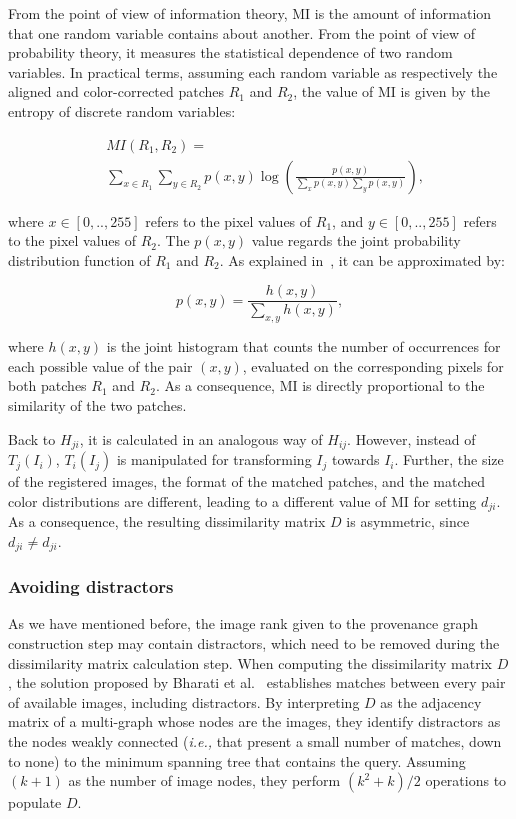 From the point of view of information theory, MI is the amount of information that one random variable contains about another.
From the point of view of probability theory, it measures the statistical dependence of two random variables.
In practical terms, assuming each random variable as respectively the aligned and color-corrected patches $R_1$ and $R_2$, the value of MI is given by the entropy of discrete random variables:
\vspace{-0.2cm}

\begin{equation}
\begin{aligned}
& MI(R_1, R_2) = \\
& \sum_{x \in R_1}^{ }{\sum_{y \in R_2}^{ }{p(x, y)}} \log \left ( \frac{p(x, y)}{\sum_{x}^{ } {p(x, y)} \sum_{y}^{ } {p(x, y)}} \right ),
\end{aligned}
\end{equation}

\noindent where $x \in [0,..,255]$ refers to the pixel values of $R_1$, and $y \in [0,..,255]$ refers to the pixel values of $R_2$.
The $p(x, y)$ value regards the joint probability distribution function of $R_1$ and $R_2$.
As explained in~\cite{Costa_2017}, it can be approximated by:

\begin{equation}
p(x, y) = \frac{h(x, y)}{\sum_{x, y}^{ } {h(x, y)}},
\end{equation}

\noindent where $h(x, y)$ is the joint histogram that counts the number of occurrences for each possible value of the pair $(x, y)$, evaluated on the corresponding pixels for both patches $R_1$ and $R_2$.
As a consequence, MI is directly proportional to the similarity of the two patches.

Back to $H_{ji}$, it is calculated in an analogous way of $H_{ij}$.
However, instead of $T_j(I_i)$, $T_i(I_j)$ is manipulated for transforming $I_j$ towards $I_i$. Further, the size of the registered images, the format of the matched patches, and the matched color distributions are different, leading to a different value of MI for setting $d_{ji}$.
As a consequence, the resulting dissimilarity matrix $D$ is asymmetric, since $d_{ji}\ne d_{ji}$.

\vspace{0.2cm}
\subsubsection*{Avoiding distractors}
As we have mentioned before, the image rank given to the provenance graph construction step may contain distractors, which need to be removed during the dissimilarity matrix calculation step.
When computing the dissimilarity matrix $D$, the solution proposed by Bharati et al.~\cite{bharati2017uphy} establishes matches between every pair of available images, including distractors.
By interpreting $D$ as the adjacency matrix of a multi-graph whose nodes are the images, they identify distractors as the nodes weakly connected (\textit{i.e.,} that present a small number of matches, down to none) to the minimum spanning tree that contains the query.
Assuming $(k + 1)$ as the number of image nodes, they perform $(k^2 + k) / 2$ operations to populate $D$.

